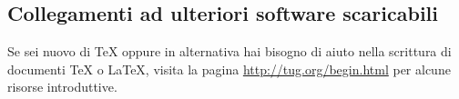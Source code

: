 \documentclass{article}
\begin{document}
\subsection{Collegamenti ad ulteriori software scaricabili}

Se sei nuovo di \TeX{} oppure in alternativa hai bisogno di aiuto nella
scrittura di documenti \TeX{} o \LaTeX{}, visita la pagina
\url{http://tug.org/begin.html} per alcune risorse introduttive.
\end{document}
